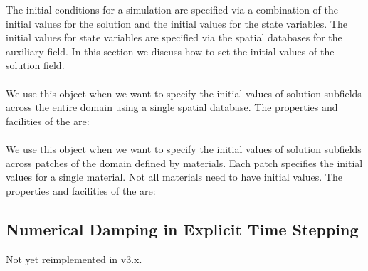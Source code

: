 The initial conditions for a simulation are specified via a
combination of the initial values for the solution and the initial
values for the state variables. The initial values for state variables
are specified via the spatial databases for the auxiliary field. In
this section we discuss how to set the initial values of the solution
field.

\paragraph{} We use this object when we
want to specify the initial values of solution subfields across the
entire domain using a single spatial database. The properties and facilities of the
 are:
\begin{inventory}
\end{inventory}

\paragraph{} We use this object when we
want to specify the initial values of solution subfields across
patches of the domain defined by materials. Each patch specifies the
initial values for a single material. Not all materials need to have
initial values. The properties and facilities of the
 are:
\begin{inventory}
\end{inventory}



\subsection{Numerical Damping in Explicit Time Stepping}

Not yet reimplemented in v3.x.

